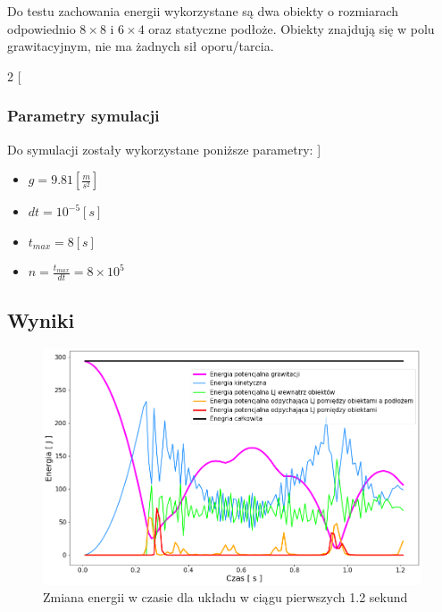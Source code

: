 \documentclass[12pt, letterpaper]{report}
\begin{document}
    Do testu zachowania energii wykorzystane są dwa obiekty o rozmiarach 
    odpowiednio $8 \times 8$ i $6 \times 4$ oraz statyczne podłoże. Obiekty
    znajdują się w polu grawitacyjnym, nie ma żadnych sił oporu/tarcia.

    \begin{multicols}{2}
        [
            \subsubsection{Parametry symulacji}
            Do symulacji zostały wykorzystane poniższe parametry:
        ]
        \begin{itemize}
            \item $g = 9.81 [\frac{m}{s^2}]$
            \item $dt = 10^{-5} [s]$
        \end{itemize}
        \begin{itemize}
            \item $t_{max} = 8 [s]$
            \item $n = \frac{t_{max}}{dt} = 8 \times 10^{5}$
        \end{itemize}
    \end{multicols}

    \subsection{Wyniki}
    \begin{figure}[H]
        \centering
        \includegraphics[width=14cm]{energy_test_0to2s}
        \caption{Zmiana energii w czasie dla układu w ciągu pierwszych 1.2 sekund}
    \end{figure}
\end{document}

